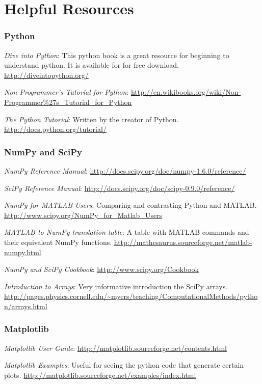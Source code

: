 \section*{Helpful Resources}
\subsubsection*{Python}
\noindent \emph{Dive into Python}:  This python book is a great resource for beginning to understand python.  It is available for for free download. \url{http://diveintopython.org/}

\noindent \emph{Non-Programmer's Tutorial for Python}: \url{http://en.wikibooks.org/wiki/Non-Programmer\%27s_Tutorial_for_Python}

\noindent \emph{The Python Tutorial}: Written by the creator of Python. \url{http://docs.python.org/tutorial/}

\subsubsection*{NumPy and SciPy}
\noindent \emph{NumPy Reference Manual}: \url{http://docs.scipy.org/doc/numpy-1.6.0/reference/}

\noindent \emph{SciPy Reference Manual}: \url{http://docs.scipy.org/doc/scipy-0.9.0/reference/}

\noindent \emph{NumPy for MATLAB Users}: Comparing and contrasting Python and MATLAB. \url{http://www.scipy.org/NumPy_for_Matlab_Users}

\noindent \emph{MATLAB to NumPy translation table}: A table with MATLAB commands and their equivalent NumPy functions.   \url{http://mathesaurus.sourceforge.net/matlab-numpy.html}

\noindent \emph{NumPy and SciPy Cookbook}: \url{http://www.scipy.org/Cookbook}

\noindent \emph{Introduction to Arrays}: Very informative introduction the SciPy arrays. \url{http://pages.physics.cornell.edu/~myers/teaching/ComputationalMethods/python/arrays.html}

\subsubsection*{Matplotlib}
\noindent \emph{Matplotlib User Guide}: \url{http://matplotlib.sourceforge.net/contents.html}

\noindent \emph{Matplotlib Examples}: Useful for seeing the python code that generate certain plots. \url{http://matplotlib.sourceforge.net/examples/index.html}



